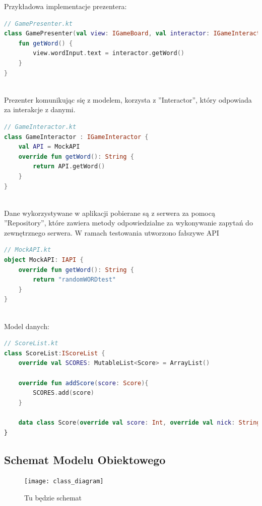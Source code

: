 \documentclass[12pt,a4paper]{article}
\begin{document}
Przykładowa implementacje prezentera:\\
\begin{lstlisting}[caption={Prezenter}, label={lst:example4}, language=Kotlin]
// GamePresenter.kt
class GamePresenter(val view: IGameBoard, val interactor: IGameInteractor){
    fun getWord() {
        view.wordInput.text = interactor.getWord()
    }
}
\end{lstlisting}\\
Prezenter komunikując się z modelem, korzysta z ''Interactor'', który odpowiada za interakcje z danymi.\\
\begin{lstlisting}[caption={Interactor}, label={lst:example5}, language=Kotlin]
// GameInteractor.kt
class GameInteractor : IGameInteractor {
    val API = MockAPI
    override fun getWord(): String {
        return API.getWord()
    }
}
\end{lstlisting}\\
Dane wykorzystywane w aplikacji pobierane są z serwera za pomocą ''Repository'', które zawiera metody odpowiedzialne za wykonywanie zapytań do zewnętrznego serwera. W ramach testowania utworzono fałszywe API\\
\begin{lstlisting}[caption={Repository}, label={lst:example6}, language=Kotlin]
// MockAPI.kt
object MockAPI: IAPI {
    override fun getWord(): String {
        return "randomWORDtest"
    }
}
\end{lstlisting}\\
Model danych: \\
\begin{lstlisting}[caption={Model Danych}, label={lst:example7}, language=Kotlin]
// ScoreList.kt
class ScoreList:IScoreList {
    override val SCORES: MutableList<Score> = ArrayList()

    override fun addScore(score: Score){
        SCORES.add(score)
    }

    data class Score(override val score: Int, override val nick: String) : IScore
}
\end{lstlisting}

\subsection{Schemat Modelu Obiektowego}
			\begin{figure}[H]
			\centering
			\texttt{[image: class\_diagram]}
			\caption{Tu będzie schemat}
			\end{figure}
\end{document}
